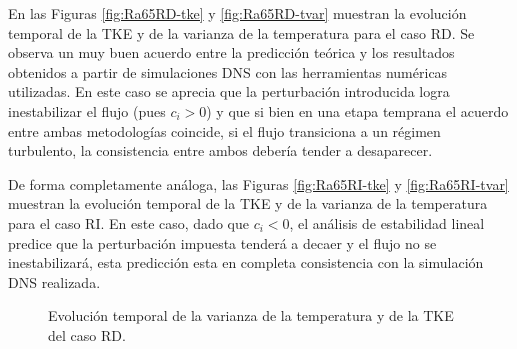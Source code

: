 En las Figuras \ref{fig:Ra65RD-tke} y \ref{fig:Ra65RD-tvar} muestran la evolución temporal de la TKE y de la varianza de la temperatura para el caso RD. Se observa un muy buen acuerdo entre la predicción teórica y los resultados obtenidos a partir de simulaciones DNS con las herramientas numéricas utilizadas. En este caso se aprecia que la perturbación introducida logra inestabilizar el flujo (pues $c_i>0$) y que si bien en una etapa temprana el acuerdo entre ambas metodologías coincide, si el flujo transiciona a un régimen turbulento, la consistencia entre ambos debería tender a desaparecer.  

De forma completamente análoga, las Figuras \ref{fig:Ra65RI-tke} y \ref{fig:Ra65RI-tvar} muestran la evolución temporal de la TKE y de la varianza de la temperatura para el caso RI. En este caso, dado que $c_i<0$, el análisis de estabilidad lineal predice que la perturbación impuesta tenderá a decaer y el flujo no se inestabilizará, esta predicción esta en completa consistencia con la simulación DNS realizada.   

\begin{figure}[H]
 \centering
 \caption{Evolución temporal de la varianza de la temperatura y de la TKE del caso RD.} 
 \label{fig:Ra65R-DI}
\end{figure}

